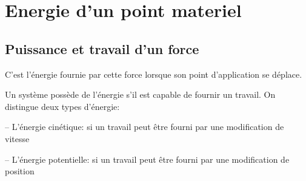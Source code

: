 \section{Energie d'un point materiel}

\subsection{Puissance et travail d'un force}

\begin{defi}
    C'est l'énergie fournie par cette force lorsque son point d'application se déplace.
\end{defi}

\begin{defi}
    Un système possède de l'énergie s'il est capable de fournir un travail.
    On distingue deux types d'énergie:

    -- L'énergie cinétique: si un travail peut être fourni par une modification de vitesse
    
    -- L'énergie potentielle: si un travail peut être fourni par une modification de position
\end{defi}